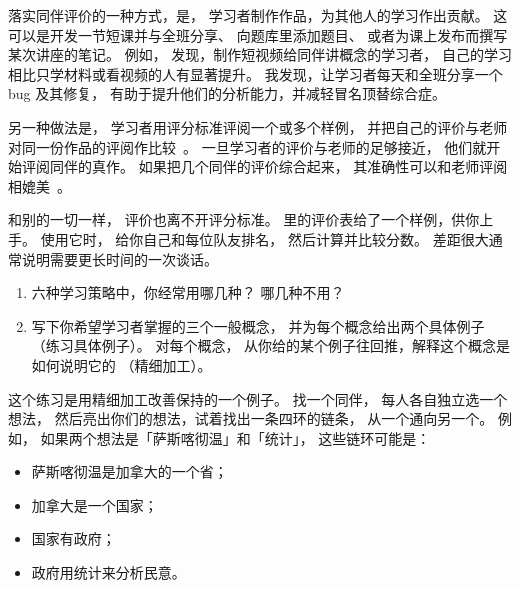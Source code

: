 落实同伴评价的一种方式，是，
学习者制作作品，为其他人的学习作出贡献。
这可以是开发一节短课并与全班分享、
向题库里添加题目、
或者为课上发布而撰写某次讲座的笔记。
例如，
\cite{Fran2018}发现，制作短视频给同伴讲概念的学习者，
自己的学习相比只学材料或看视频的人有显著提升。
我发现，让学习者每天和全班分享一个 bug 及其修复，
有助于提升他们的分析能力，并减轻冒名顶替综合症。

另一种做法是，
学习者用评分标准评阅一个或多个样例，
并把自己的评价与老师对同一份作品的评阅作比较~\cite{Kulk2013}。
一旦学习者的评价与老师的足够接近，
他们就开始评阅同伴的真作。
如果把几个同伴的评价综合起来，
其准确性可以和老师评阅相媲美~\cite{Pare2008}。

和别的一切一样，
评价也离不开评分标准。
里的评价表给了一个样例，供你上手。
使用它时，
给你自己和每位队友排名，
然后计算并比较分数。
差距很大通常说明需要更长时间的一次谈话。



\begin{enumerate}

\item
  六种学习策略中，你经常用哪几种？
  哪几种不用？

\item
  写下你希望学习者掌握的三个一般概念，
  并为每个概念给出两个具体例子
  （练习具体例子）。
  对每个概念，
  从你给的某个例子往回推，解释这个概念是如何说明它的
  （精细加工）。

\end{enumerate}


这个练习是用精细加工改善保持的一个例子。
找一个同伴，
每人各自独立选一个想法，
然后亮出你们的想法，试着找出一条四环的链条，
从一个通向另一个。
例如，
如果两个想法是「萨斯喀彻温」和「统计」，
这些链环可能是：

\begin{itemize}

\item
  萨斯喀彻温是加拿大的一个省；

\item
  加拿大是一个国家；

\item
  国家有政府；

\item
  政府用统计来分析民意。

\end{itemize}

